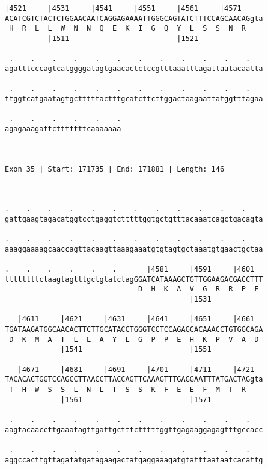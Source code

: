 \documentclass{article}
\begin{document}
\begin{Verbatim}
|4521     |4531     |4541     |4551     |4561     |4571     
ACATCGTCTACTCTGGAACAATCAGGAGAAAATTGGGCAGTATCTTTCCAGCAACAGgta
 H  R  L  L  W  N  N  Q  E  K  I  G  Q  Y  L  S  S  N  R    
          |1511                         |1521               
  
 .    .    .    .    .    .    .    .    .    .    .    .   
agatttcccagtcatggggatagtgaacactctccgtttaaatttagattaatacaatta
                                                            
 .    .    .    .    .    .    .    .    .    .    .    .   
ttggtcatgaatagtgctttttactttgcatcttcttggactaagaattatggtttagaa
                                                            
 .    .    .    .    .    .
agagaaagattctttttttcaaaaaaa
                           
                           
 
Exon 35 | Start: 171735 | End: 171881 | Length: 146



.    .    .    .    .    .    .    .    .    .    .    .    
gattgaagtagacatggtcctgaggtctttttggtgctgtttacaaatcagctgacagta
                                                            
.    .    .    .    .    .    .    .    .    .    .    .    
aaaggaaaagcaaccagttacaagttaaagaaatgtgtagtgctaaatgtgaactgctaa
                                                            
.    .    .    .    .    .       |4581     |4591     |4601  
ttttttttctaagtagtttgctgtatctagGGATCATAAAGCTGTTGGAAGACGACCTTT
                               D  H  K  A  V  G  R  R  P  F 
                                           |1531            
  
   |4611     |4621     |4631     |4641     |4651     |4661  
TGATAAGATGGCAACACTTCTTGCATACCTGGGTCCTCCAGAGCACAAACCTGTGGCAGA
 D  K  M  A  T  L  L  A  Y  L  G  P  P  E  H  K  P  V  A  D 
             |1541                         |1551            
  
   |4671     |4681     |4691     |4701     |4711     |4721  
TACACACTGGTCCAGCCTTAACCTTACCAGTTCAAAGTTTGAGGAATTTATGACTAGgta
 T  H  W  S  S  L  N  L  T  S  S  K  F  E  E  F  M  T  R    
             |1561                         |1571            
  
 .    .    .    .    .    .    .    .    .    .    .    .   
aagtacaaccttgaaatagttgattgctttctttttggttgagaaggagagtttgccacc
                                                            
 .    .    .    .    .    .    .    .    .    .    .    .   
aggccacttgttagatatgatagaagactatgaggaaagatgtatttaataatcacattg
                                                            

\end{Verbatim}
\end{document}
